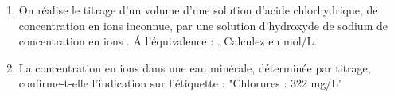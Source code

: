 \documentclass[11pt,a4paper]{article}
\newcommand{\cadreblanc}[1]{%
\medskip\framebox[\linewidth][c]{%
\rule{0mm}{#1mm}}\par
\medskip}
\begin{document}
    



\begin{enumerate}
    \item On réalise le titrage d'un volume  d'une solution d'acide chlorhydrique, de concentration  en ions  inconnue, par une solution d'hydroxyde de sodium de concentration  en ions . \'A l'équivalence : . Calculez  en mol/L. 

\cadreblanc{15}


\item La concentration  en ions  dans une eau minérale, déterminée par titrage, confirme-t-elle l'indication sur l'étiquette : "Chlorures : 322 mg/L"

\cadreblanc{22}

\end{enumerate}
\end{document}
